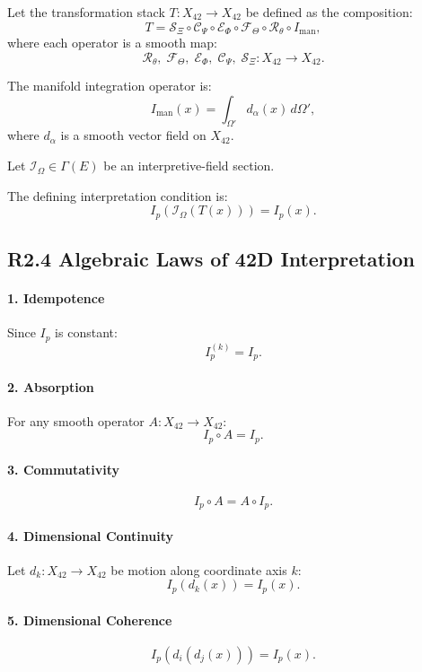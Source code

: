 Let the transformation stack $T : X_{42} \to X_{42}$ be defined as the
composition:
\[
T = 
\mathcal{S}_{\Xi} \circ
\mathcal{C}_{\Psi} \circ
\mathcal{E}_{\Phi} \circ
\mathcal{F}_{\Theta} \circ
\mathcal{R}_{\theta} \circ
I_{\mathrm{man}},
\]
where each operator is a smooth map:
\[
\mathcal{R}_{\theta},\;
\mathcal{F}_{\Theta},\;
\mathcal{E}_{\Phi},\;
\mathcal{C}_{\Psi},\;
\mathcal{S}_{\Xi}
: X_{42} \to X_{42}.
\]

The manifold integration operator is:
\[
I_{\mathrm{man}}(x) = \int_{\Omega'} d_{\alpha}(x)\, d\Omega',
\]
where $d_{\alpha}$ is a smooth vector field on $X_{42}$.

Let $\mathcal{I}_{\Omega} \in \Gamma(E)$ be an interpretive-field section.

The defining interpretation condition is:
\[
I_p(\mathcal{I}_{\Omega}(T(x))) = I_p(x).
\]

\subsection*{R2.4 Algebraic Laws of 42D Interpretation}

\paragraph{1. Idempotence}
Since $I_p$ is constant:
\[
I_p^{(k)} = I_p.
\]

\paragraph{2. Absorption}
For any smooth operator $A : X_{42} \to X_{42}$:
\[
I_p \circ A = I_p.
\]

\paragraph{3. Commutativity}
\[
I_p \circ A = A \circ I_p.
\]

\paragraph{4. Dimensional Continuity}
Let $d_k : X_{42} \to X_{42}$ be motion along coordinate axis $k$:
\[
I_p(d_k(x)) = I_p(x).
\]

\paragraph{5. Dimensional Coherence}
\[
I_p(d_i(d_j(x))) = I_p(x).
\]

